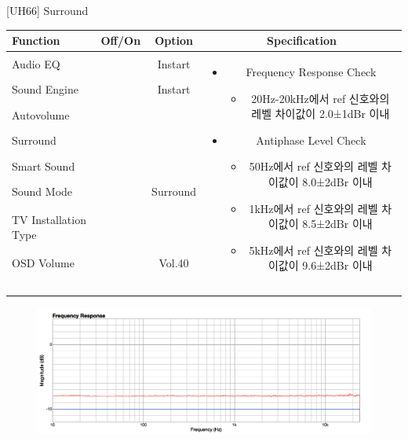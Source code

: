 \begin{frame}[t]{[UH66] Surround}
\begin{tiny}
\begin{tabular}{@{}lccc@{}}
\toprule
Function & Off/On & Option & Specification \\
\midrule
Audio EQ & \color{black}{Off} & Instart &
\multirow{10}{60mm}{
\begin{itemize}\vspace{-3mm}
\item Frequency Response Check
	\begin{itemize}
	\item 20Hz-20kHz에서 ref 신호와의 레벨 차이값이 2.0±1dBr 이내	
	\end{itemize}
\item Antiphase Level Check
	\begin{itemize}
	\item 50Hz에서 ref 신호와의 레벨 차이값이 8.0±2dBr 이내
	\item 1kHz에서 ref 신호와의 레벨 차이값이 8.5±2dBr 이내
	\item 5kHz에서 ref 신호와의 레벨 차이값이 9.6±2dBr 이내
	\end{itemize}
\end{itemize}
} \\
Sound Engine & \color{blue}{On} & Instart & \\
Autovolume & \color{black}{Off} & & \\
Surround & \color{blue}{On} & & \\
Smart Sound & \color{black}{Off} & & \\
Sound Mode & \color{blue}{On} & Surround & \\
TV Installation Type & \color{blue}{On} & \color{black}{Standtype1} & \\
OSD Volume & \color{blue}{On} & Vol.40 & \\
& & & \\
& & & \\
& & & \\
& & & \\
\midrule
\end{tabular}
\end{tiny}

\begin{figure}[b]
\includegraphics[height=0.3\textwidth]{figures/surround.png}
\end{figure}

\end{frame}
